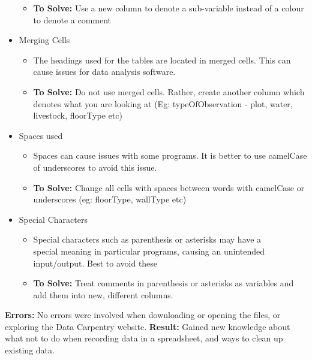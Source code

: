 \documentclass{article}
\begin{document}
\begin{itemize}
\begin{itemize}
        \item \textbf{To Solve:} Use a new column to denote a sub-variable instead of a colour to denote a comment
    \end{itemize}
    \item Merging Cells
    \begin{itemize}
        \item The headings used for the tables are located in merged cells. This can cause issues for data analysis software.
        \item \textbf{To Solve:} Do not use merged cells. Rather, create another column which denotes what you are looking at (Eg: typeOfObservation - plot, water, livestock, floorType etc)
    \end{itemize}
    \item Spaces used
    \begin{itemize}
        \item Spaces can cause issues with some programs. It is better to use camelCase of underscores to avoid this issue.
        \item \textbf{To Solve:} Change all cells with spaces between words with camelCase or underscores (eg: floorType, wallType etc)
    \end{itemize}
    \item Special Characters
    \begin{itemize}
        \item Special characters such as parenthesis or asterisks may have a \\
        special meaning in particular programs, causing an unintended input/output. Best to avoid these
        \item \textbf{To Solve:} Treat comments in parenthesis or asterisks as variables and add them into new, different columns.
    \end{itemize}
\end{itemize}
\textbf{Errors:} No errors were involved when downloading or opening the files, or exploring the Data Carpentry website.
\newline
\textbf{Result:} Gained new knowledge about what not to do when recording data in a spreadsheet, and ways to clean up existing data.
%
\end{document}
